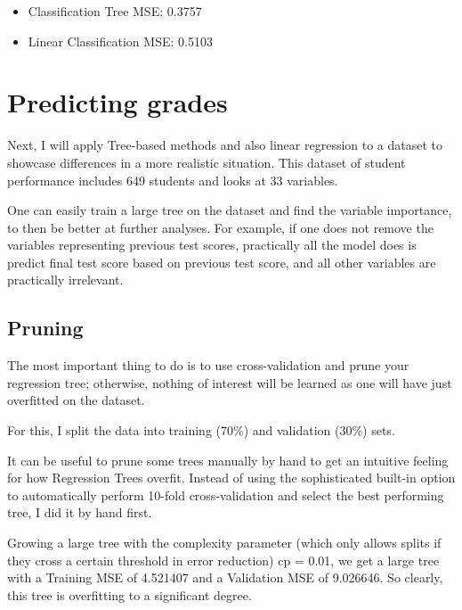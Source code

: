 \documentclass[12pt]{article}
\begin{document}
\begin{itemize}
    \item Classification Tree MSE: 0.3757
    \item Linear Classification MSE: 0.5103
\end{itemize}





\section{Predicting grades}


Next, I will apply Tree-based methods and also linear regression to a dataset to showcase differences in a more realistic situation. This dataset of student performance includes 649 students and looks at 33 variables.


One can easily train a large tree on the dataset and find the variable importance, to then be better at further analyses. For example, if one does not remove the variables representing previous test scores, practically all the model does is predict final test score based on previous test score, and all other variables are practically irrelevant.


\subsection{Pruning}

The most important thing to do is to use cross-validation and prune your regression tree; otherwise, nothing of interest will be learned as one will have just overfitted on the dataset.

For this, I split the data into training (70\%) and validation (30\%) sets.

It can be useful to prune some trees manually by hand to get an intuitive feeling for how Regression Trees overfit. Instead of using the sophisticated built-in option to automatically perform 10-fold cross-validation and select the best performing tree, I did it by hand first.

Growing a large tree with the complexity parameter (which only allows splits if they cross a certain threshold in error reduction) cp = 0.01, we get a large tree with a Training MSE of 4.521407 and a Validation MSE of 9.026646. So clearly, this tree is overfitting to a significant degree.
\end{document}
